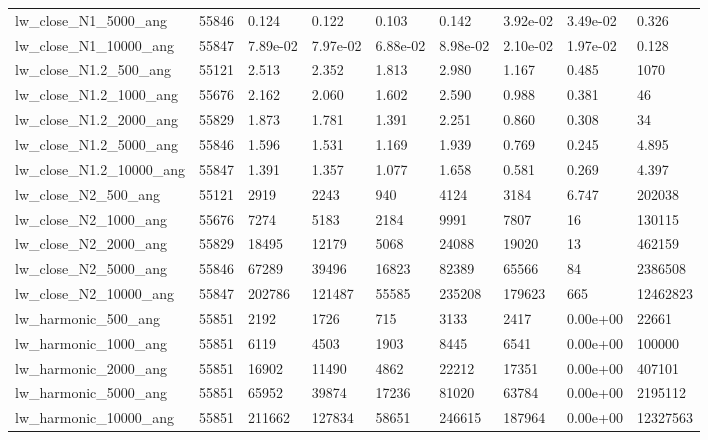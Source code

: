 \begin{tabular}{lrlllllll}
lw\_close\_N1\_5000\_ang & 55846 & 0.124 & 0.122 & 0.103 & 0.142 & 3.92e-02 & 3.49e-02 & 0.326 \\
lw\_close\_N1\_10000\_ang & 55847 & 7.89e-02 & 7.97e-02 & 6.88e-02 & 8.98e-02 & 2.10e-02 & 1.97e-02 & 0.128 \\
lw\_close\_N1.2\_500\_ang & 55121 & 2.513 & 2.352 & 1.813 & 2.980 & 1.167 & 0.485 & 1070 \\
lw\_close\_N1.2\_1000\_ang & 55676 & 2.162 & 2.060 & 1.602 & 2.590 & 0.988 & 0.381 & 46 \\
lw\_close\_N1.2\_2000\_ang & 55829 & 1.873 & 1.781 & 1.391 & 2.251 & 0.860 & 0.308 & 34 \\
lw\_close\_N1.2\_5000\_ang & 55846 & 1.596 & 1.531 & 1.169 & 1.939 & 0.769 & 0.245 & 4.895 \\
lw\_close\_N1.2\_10000\_ang & 55847 & 1.391 & 1.357 & 1.077 & 1.658 & 0.581 & 0.269 & 4.397 \\
lw\_close\_N2\_500\_ang & 55121 & 2919 & 2243 & 940 & 4124 & 3184 & 6.747 & 202038 \\
lw\_close\_N2\_1000\_ang & 55676 & 7274 & 5183 & 2184 & 9991 & 7807 & 16 & 130115 \\
lw\_close\_N2\_2000\_ang & 55829 & 18495 & 12179 & 5068 & 24088 & 19020 & 13 & 462159 \\
lw\_close\_N2\_5000\_ang & 55846 & 67289 & 39496 & 16823 & 82389 & 65566 & 84 & 2386508 \\
lw\_close\_N2\_10000\_ang & 55847 & 202786 & 121487 & 55585 & 235208 & 179623 & 665 & 12462823 \\
lw\_harmonic\_500\_ang & 55851 & 2192 & 1726 & 715 & 3133 & 2417 & 0.00e+00 & 22661 \\
lw\_harmonic\_1000\_ang & 55851 & 6119 & 4503 & 1903 & 8445 & 6541 & 0.00e+00 & 100000 \\
lw\_harmonic\_2000\_ang & 55851 & 16902 & 11490 & 4862 & 22212 & 17351 & 0.00e+00 & 407101 \\
lw\_harmonic\_5000\_ang & 55851 & 65952 & 39874 & 17236 & 81020 & 63784 & 0.00e+00 & 2195112 \\
lw\_harmonic\_10000\_ang & 55851 & 211662 & 127834 & 58651 & 246615 & 187964 & 0.00e+00 & 12327563 \\
\bottomrule
\end{tabular}
